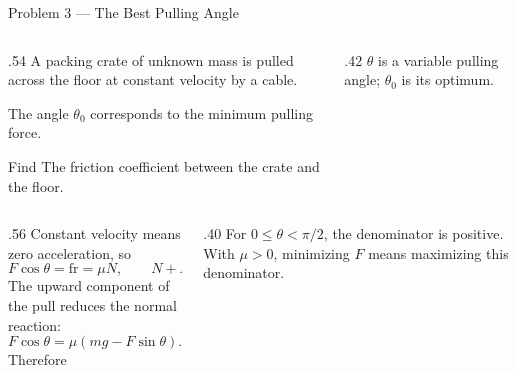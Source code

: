 \begin{frame}{Problem 3 — The Best Pulling Angle}
  \par
  \small
  \begin{columns}[T,onlytextwidth]
    \begin{column}{.54\textwidth}
      A packing crate of unknown mass is pulled across the floor at
      constant velocity by a cable.

      \medskip
      The angle \(\theta_0\) corresponds to the minimum pulling force.

      \medskip
      \begin{block}{Find}
        The friction coefficient between the crate and the floor.
      \end{block}

    \end{column}
    \begin{column}{.42\textwidth}
      \medskip
      \(\theta\) is a variable pulling angle; \(\theta_0\) is its optimum.
    \end{column}
  \end{columns}
\end{frame}

\begin{solutionframe}
  \begin{columns}[T,onlytextwidth]
    \begin{column}{.56\textwidth}
      Constant velocity means zero acceleration, so
      \[
        F\cos\theta=\mathrm{fr}=\mu N,\qquad
        N+F\sin\theta=mg.
      \]
      The upward component of the pull reduces the normal reaction:
      \[
        F\cos\theta=\mu(mg-F\sin\theta).
      \]
      Therefore
    \end{column}
    \begin{column}{.40\textwidth}
      \medskip
      For \(0\le\theta<\pi/2\), the denominator is positive.
      With \(\mu>0\), minimizing \(F\) means maximizing this denominator.
    \end{column}
  \end{columns}
\end{solutionframe}

